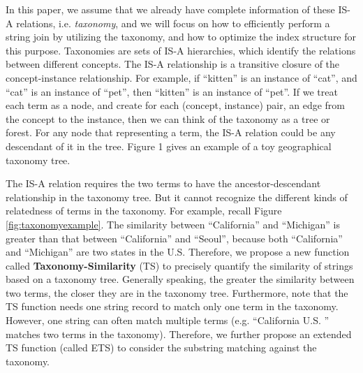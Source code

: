 In this paper, we assume that we already have complete
information of these IS-A relations, i.e. \textit{taxonomy}, and we will focus on how
to efficiently perform a string join by utilizing the taxonomy, and how to optimize the index structure
for this purpose.  Taxonomies are sets of IS-A hierarchies, which identify the relations between different concepts. The IS-A relationship
is a transitive closure of the concept-instance relationship.
For example, if ``\textsf{kitten}'' is an instance of ``\textsf{cat}'', and
``\textsf{cat}'' is an instance of ``\textsf{pet}'', then ``\textsf{kitten}'' is an instance
of ``\textsf{pet}''. If we treat each term as a node, and create
for each (concept, instance) pair, an edge from the concept
to the instance, then we can think of the taxonomy as a tree or forest. For any node that representing a term,
the IS-A relation could be any descendant of it in the tree. Figure
1 gives an example of a toy geographical taxonomy tree.









The IS-A relation requires the two terms to have the ancestor-descendant relationship in the taxonomy tree. But it cannot recognize the different kinds of relatedness of terms in the taxonomy. For example, recall Figure \ref{fig:taxonomyexample}. The similarity between ``\textsf{California}'' and ``\textsf{Michigan}'' is greater than that between ``\textsf{California}'' and ``\textsf{Seoul}'', because  both ``\textsf{California}'' and ``\textsf{Michigan}'' are two states in the U.S. Therefore, we propose a new function called \textbf{Taxonomy-Similarity} (TS) to precisely quantify the similarity of strings based on a taxonomy tree. Generally speaking,  the greater the similarity between two terms, the closer they are in the taxonomy tree.  Furthermore, note that the TS function needs one string record to  match only one term in the taxonomy. However, one string can often match multiple terms (e.g. ``\textsf{California U.S.} '' matches two terms in the taxonomy). Therefore, we further propose an extended TS function (called ETS) to  consider the substring matching against the taxonomy.


